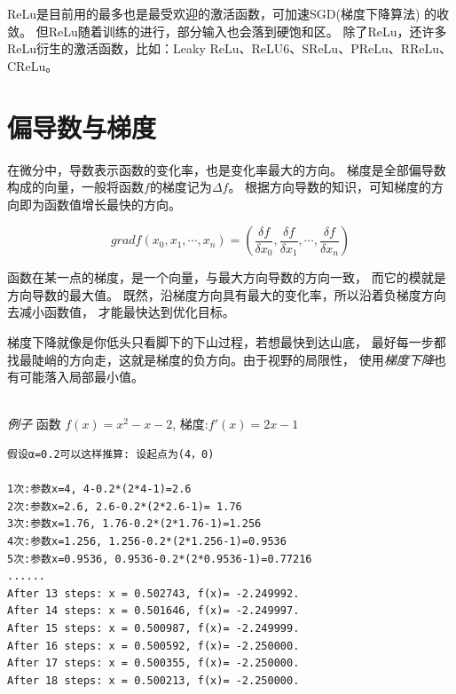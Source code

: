 ReLu是目前用的最多也是最受欢迎的激活函数，可加速SGD(梯度下降算法) 的收敛。
但ReLu随着训练的进行，部分输入也会落到硬饱和区。
除了ReLu，还许多ReLu衍生的激活函数，比如：Leaky ReLu、ReLU6、SReLu、PReLu、RReLu、CReLu。


\section{偏导数与梯度}
在微分中，导数表示函数的变化率，也是变化率最大的方向。
梯度是全部偏导数构成的向量，一般将函数$f$的梯度记为$\Delta f$。
根据方向导数的知识，可知梯度的方向即为函数值增长最快的方向。

$$ grad f(x_0, x_1,\cdots, x_n) = (
		\frac{\delta f}{\delta x_0},
		\frac{\delta f}{\delta x_1},
		\cdots,
		\frac{\delta f}{\delta x_n}
) $$

\noindent
函数在某一点的梯度，是一个向量，与最大方向导数的方向一致，
而它的模就是方向导数的最大值。
既然，沿梯度方向具有最大的变化率，所以沿着负梯度方向去减小函数值，
才能最快达到优化目标。

\begin{figure}[!h]
\centering
{}
\hspace{0.1cm}
\end{figure}

\noindent
梯度下降就像是你低头只看脚下的下山过程，若想最快到达山底，
最好每一步都找最陡峭的方向走，这就是梯度的负方向。由于视野的局限性，
使用\emph{梯度下降}也有可能落入局部最小值。

\ \\
\noindent \emph{例子}
	函数 $f(x)=x^2-x-2$, 梯度:$f'(x) = 2x-1$
\begin{lstlisting}[numbers=none]
假设α=0.2可以这样推算: 设起点为(4，0)

1次:参数x=4, 4-0.2*(2*4-1)=2.6
2次:参数x=2.6, 2.6-0.2*(2*2.6-1)= 1.76 
3次:参数x=1.76, 1.76-0.2*(2*1.76-1)=1.256 
4次:参数x=1.256, 1.256-0.2*(2*1.256-1)=0.9536 
5次:参数x=0.9536, 0.9536-0.2*(2*0.9536-1)=0.77216 
......
After 13 steps: x = 0.502743, f(x)= -2.249992. 
After 14 steps: x = 0.501646, f(x)= -2.249997. 
After 15 steps: x = 0.500987, f(x)= -2.249999. 
After 16 steps: x = 0.500592, f(x)= -2.250000. 
After 17 steps: x = 0.500355, f(x)= -2.250000. 
After 18 steps: x = 0.500213, f(x)= -2.250000.
\end{lstlisting}

